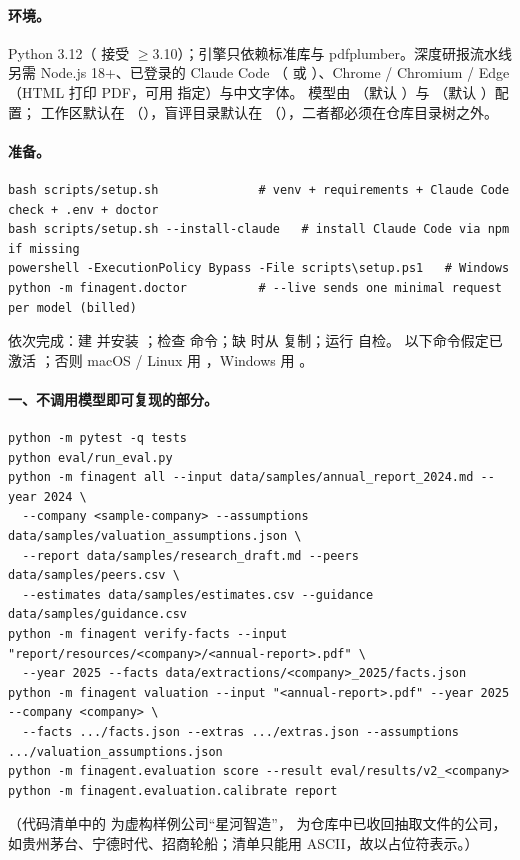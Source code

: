 \paragraph{环境。}
Python 3.12（ 接受 $\ge$3.10）；引擎只依赖标准库与 pdfplumber。深度研报流水线另需 Node.js 18+、已登录的 Claude Code
（ 或 ）、Chrome / Chromium / Edge（HTML 打印 PDF，可用  指定）与中文字体。
模型由 （默认 ）与 （默认 ）配置；
工作区默认在 （），盲评目录默认在 （），二者都必须在仓库目录树之外。

\paragraph{准备。}
\begin{lstlisting}
bash scripts/setup.sh              # venv + requirements + Claude Code check + .env + doctor
bash scripts/setup.sh --install-claude   # install Claude Code via npm if missing
powershell -ExecutionPolicy Bypass -File scripts\setup.ps1   # Windows
python -m finagent.doctor          # --live sends one minimal request per model (billed)
\end{lstlisting}
 依次完成：建  并安装 ；检查  命令；缺  时从  复制；运行  自检。
以下命令假定已激活 ；否则 macOS / Linux 用 ，Windows 用 。

\paragraph{一、不调用模型即可复现的部分。}
\begin{lstlisting}
python -m pytest -q tests
python eval/run_eval.py
python -m finagent all --input data/samples/annual_report_2024.md --year 2024 \
  --company <sample-company> --assumptions data/samples/valuation_assumptions.json \
  --report data/samples/research_draft.md --peers data/samples/peers.csv \
  --estimates data/samples/estimates.csv --guidance data/samples/guidance.csv
python -m finagent verify-facts --input "report/resources/<company>/<annual-report>.pdf" \
  --year 2025 --facts data/extractions/<company>_2025/facts.json
python -m finagent valuation --input "<annual-report>.pdf" --year 2025 --company <company> \
  --facts .../facts.json --extras .../extras.json --assumptions .../valuation_assumptions.json
python -m finagent.evaluation score --result eval/results/v2_<company>
python -m finagent.evaluation.calibrate report
\end{lstlisting}
（代码清单中的 \code{<sample-company>} 为虚构样例公司“星河智造”，\code{<company>} 为仓库中已收回抽取文件的公司，如贵州茅台、宁德时代、招商轮船；清单只能用 ASCII，故以占位符表示。）

